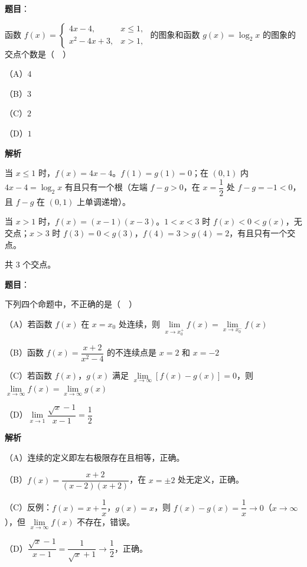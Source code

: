 \begin{answer}

\textbf{题目}：

函数 $f(x)=\begin{cases}4x-4,&x\leqslant1,\\ x^2-4x+3,&x>1,\end{cases}$ 的图象和函数 $g(x)=\log_2x$ 的图象的交点个数是（　）

（A）$4$

（B）$3$

（C）$2$

（D）$1$

\textbf{解析}

当 $x\leqslant1$ 时，$f(x)=4x-4$。$f(1)=g(1)=0$；在 $(0,1)$ 内 $4x-4=\log_2x$ 有且只有一个根（左端 $f-g>0$，在 $x=\dfrac12$ 处 $f-g=-1<0$，且 $f-g$ 在 $(0,1)$ 上单调递增）。

当 $x>1$ 时，$f(x)=(x-1)(x-3)$。$1<x<3$ 时 $f(x)<0<g(x)$，无交点；$x>3$ 时 $f(3)=0<g(3)$，$f(4)=3>g(4)=2$，有且只有一个交点。

共 $3$ 个交点。


\end{answer}
\begin{answer}

\textbf{题目}：

下列四个命题中，不正确的是（　）

（A）若函数 $f(x)$ 在 $x=x_0$ 处连续，则 $\lim\limits_{x\to x_0^+}f(x)=\lim\limits_{x\to x_0^-}f(x)$

（B）函数 $f(x)=\dfrac{x+2}{x^2-4}$ 的不连续点是 $x=2$ 和 $x=-2$

（C）若函数 $f(x)$，$g(x)$ 满足 $\lim\limits_{x\to\infty}[f(x)-g(x)]=0$，则 $\lim\limits_{x\to\infty}f(x)=\lim\limits_{x\to\infty}g(x)$

（D）$\lim\limits_{x\to1}\dfrac{\sqrt x-1}{x-1}=\dfrac12$

\textbf{解析}

（A）连续的定义即左右极限存在且相等，正确。

（B）$f(x)=\dfrac{x+2}{(x-2)(x+2)}$，在 $x=\pm2$ 处无定义，正确。

（C）反例：$f(x)=x+\dfrac1x$，$g(x)=x$，则 $f(x)-g(x)=\dfrac1x\to0$（$x\to\infty$），但 $\lim\limits_{x\to\infty}f(x)$ 不存在，错误。

（D）$\dfrac{\sqrt x-1}{x-1}=\dfrac1{\sqrt x+1}\to\dfrac12$，正确。


\end{answer}
